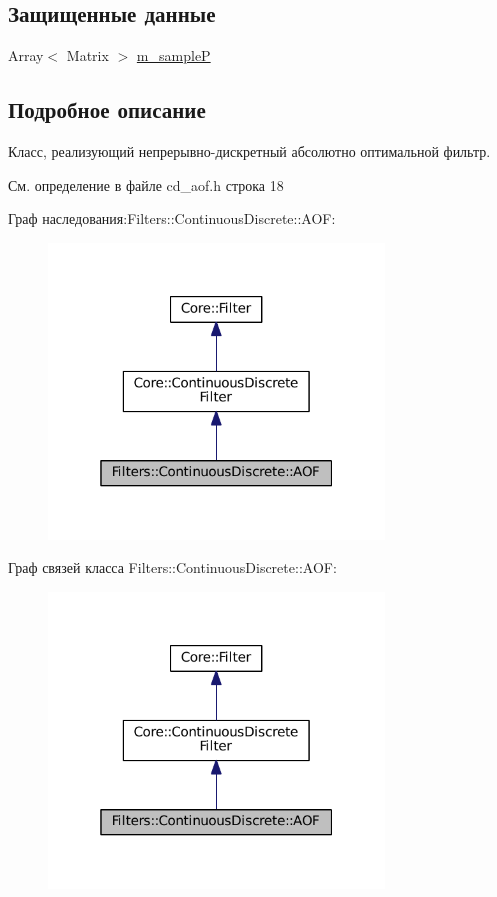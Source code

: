 \subsection*{Защищенные данные}
\begin{DoxyCompactItemize}
\item 
Array$<$ Matrix $>$ \hyperlink{class_filters_1_1_continuous_discrete_1_1_a_o_f_a31111852e94dab62675d8692a4c22df1}{m\+\_\+sampleP}
\end{DoxyCompactItemize}


\subsection{Подробное описание}
Класс, реализующий непрерывно-\/дискретный абсолютно оптимальной фильтр. 

См. определение в файле cd\+\_\+aof.\+h строка 18



Граф наследования\+:Filters\+:\+:Continuous\+Discrete\+:\+:A\+OF\+:\nopagebreak
\begin{figure}[H]
\begin{center}
\leavevmode
\includegraphics[width=253pt]{class_filters_1_1_continuous_discrete_1_1_a_o_f__inherit__graph}
\end{center}
\end{figure}


Граф связей класса Filters\+:\+:Continuous\+Discrete\+:\+:A\+OF\+:\nopagebreak
\begin{figure}[H]
\begin{center}
\leavevmode
\includegraphics[width=253pt]{class_filters_1_1_continuous_discrete_1_1_a_o_f__coll__graph}
\end{center}
\end{figure}


